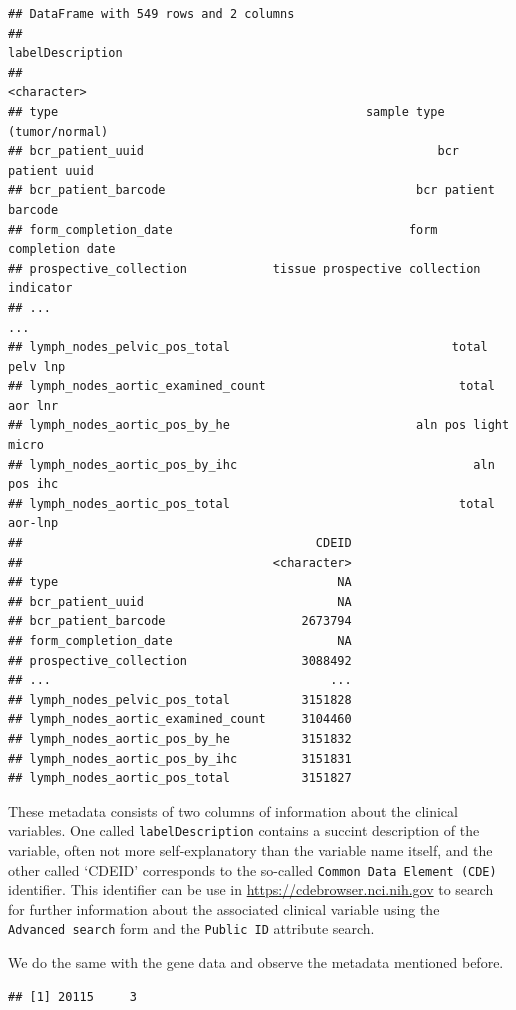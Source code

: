 \documentclass[]{article}
\begin{document}
\begin{verbatim}
## DataFrame with 549 rows and 2 columns
##                                                          labelDescription
##                                                               <character>
## type                                           sample type (tumor/normal)
## bcr_patient_uuid                                         bcr patient uuid
## bcr_patient_barcode                                   bcr patient barcode
## form_completion_date                                 form completion date
## prospective_collection            tissue prospective collection indicator
## ...                                                                   ...
## lymph_nodes_pelvic_pos_total                               total pelv lnp
## lymph_nodes_aortic_examined_count                           total aor lnr
## lymph_nodes_aortic_pos_by_he                          aln pos light micro
## lymph_nodes_aortic_pos_by_ihc                                 aln pos ihc
## lymph_nodes_aortic_pos_total                                total aor-lnp
##                                         CDEID
##                                   <character>
## type                                       NA
## bcr_patient_uuid                           NA
## bcr_patient_barcode                   2673794
## form_completion_date                       NA
## prospective_collection                3088492
## ...                                       ...
## lymph_nodes_pelvic_pos_total          3151828
## lymph_nodes_aortic_examined_count     3104460
## lymph_nodes_aortic_pos_by_he          3151832
## lymph_nodes_aortic_pos_by_ihc         3151831
## lymph_nodes_aortic_pos_total          3151827
\end{verbatim}

These metadata consists of two columns of information about the clinical
variables. One called \texttt{labelDescription} contains a succint
description of the variable, often not more self-explanatory than the
variable name itself, and the other called `CDEID' corresponds to the
so-called \texttt{Common\ Data\ Element\ (CDE)} identifier. This
identifier can be use in \url{https://cdebrowser.nci.nih.gov} to search
for further information about the associated clinical variable using the
\texttt{Advanced\ search} form and the \texttt{Public\ ID} attribute
search.

We do the same with the gene data and observe the metadata mentioned
before.

\begin{verbatim}
## [1] 20115     3
\end{verbatim}
\end{document}
